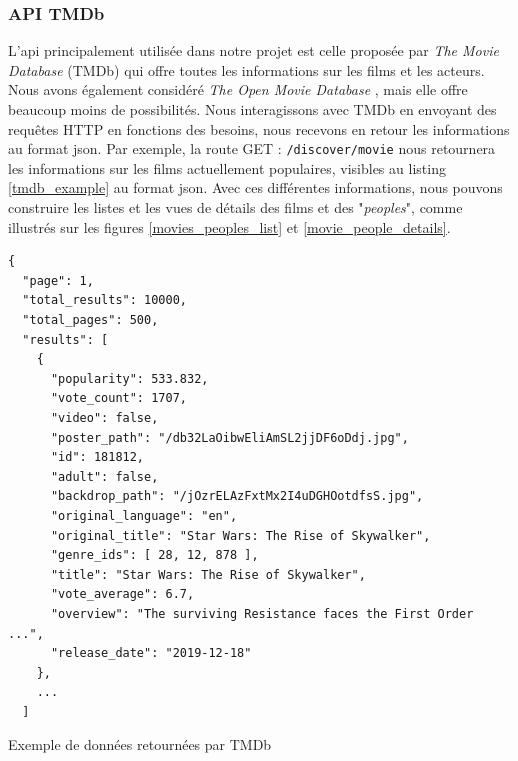 \subsubsection{API TMDb}
L'\acrshort{api} principalement utilisée dans notre projet est celle proposée par \textit{The Movie Database} (TMDb) \cite{tmdb} qui offre toutes les informations sur les films et les acteurs. Nous avons également considéré \textit{The Open Movie Database} \cite{omdb}, mais elle offre beaucoup moins de possibilités. Nous interagissons avec TMDb en envoyant des requêtes HTTP en fonctions des besoins, nous recevons en retour les informations au format \acrshort{json}. Par exemple, la route GET : \texttt{/discover/movie} nous retournera les informations sur les films actuellement populaires, visibles au listing \ref{tmdb_example} au format \acrshort{json}. Avec ces différentes informations, nous pouvons construire les listes et les vues de détails des films et des "\textit{peoples}", comme illustrés sur les figures \ref{movies_peoples_list} et \ref{movie_people_details}.
\bigbreak
\begin{code}
    \begin{verbatim}
{
  "page": 1,
  "total_results": 10000,
  "total_pages": 500,
  "results": [
    {
      "popularity": 533.832,
      "vote_count": 1707,
      "video": false,
      "poster_path": "/db32LaOibwEliAmSL2jjDF6oDdj.jpg",
      "id": 181812,
      "adult": false,
      "backdrop_path": "/jOzrELAzFxtMx2I4uDGHOotdfsS.jpg",
      "original_language": "en",
      "original_title": "Star Wars: The Rise of Skywalker",
      "genre_ids": [ 28, 12, 878 ],
      "title": "Star Wars: The Rise of Skywalker",
      "vote_average": 6.7,
      "overview": "The surviving Resistance faces the First Order ...",
      "release_date": "2019-12-18"
    },
    ...
  ]
    \end{verbatim}
    \caption{Exemple de données retournées par TMDb}
    \label{tmdb_example}
\end{code}
\bigbreak
